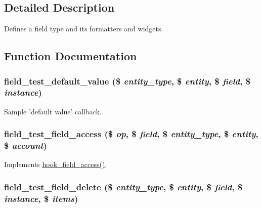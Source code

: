 \subsection{Detailed Description}
Defines a field type and its formatters and widgets. 

\subsection{Function Documentation}
\hypertarget{field__test_8field_8inc_a834998133c15e2eb1ddb7b83207036ee}{
\subsubsection[{field\_\-test\_\-default\_\-value}]{\setlength{\rightskip}{0pt plus 5cm}field\_\-test\_\-default\_\-value (\$ {\em entity\_\-type}, \/  \$ {\em entity}, \/  \$ {\em field}, \/  \$ {\em instance})}}
\label{field__test_8field_8inc_a834998133c15e2eb1ddb7b83207036ee}
Sample 'default value' callback. \hypertarget{field__test_8field_8inc_ab4f4196918d254f1afe36c9de8433267}{
\subsubsection[{field\_\-test\_\-field\_\-access}]{\setlength{\rightskip}{0pt plus 5cm}field\_\-test\_\-field\_\-access (\$ {\em op}, \/  \$ {\em field}, \/  \$ {\em entity\_\-type}, \/  \$ {\em entity}, \/  \$ {\em account})}}
\label{field__test_8field_8inc_ab4f4196918d254f1afe36c9de8433267}
Implements \hyperlink{group__hooks_ga9281312bdad448a24f3cfb7e341b36ba}{hook\_\-field\_\-access()}. \hypertarget{field__test_8field_8inc_a464cdbf377c9cb309ce5c1257be479a3}{
\subsubsection[{field\_\-test\_\-field\_\-delete}]{\setlength{\rightskip}{0pt plus 5cm}field\_\-test\_\-field\_\-delete (\$ {\em entity\_\-type}, \/  \$ {\em entity}, \/  \$ {\em field}, \/  \$ {\em instance}, \/  \$ {\em items})}}

